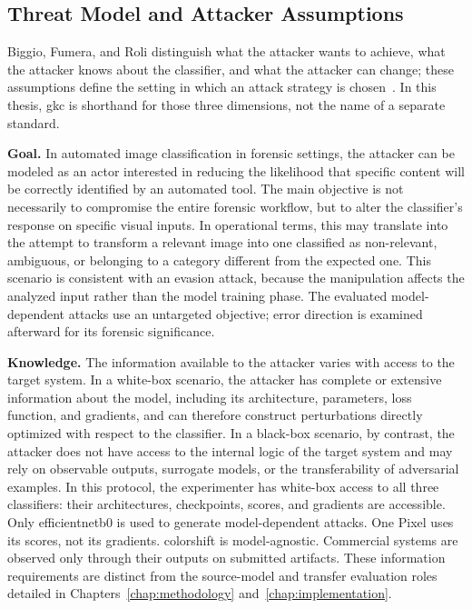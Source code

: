 \subsection{Threat Model and Attacker Assumptions}
\label{subsec:background_threat_model}
Biggio, Fumera, and Roli distinguish what the attacker wants to achieve,
what the attacker knows about the classifier, and what the attacker can
change; these assumptions define the setting in which an attack strategy is
chosen~\cite{biggio2014security,biggio2018wild}. In this thesis, \gls{gkc} is shorthand
for those three dimensions, not the name of a separate standard.

\textbf{Goal.} In automated image classification in forensic settings, the
attacker can be modeled as an actor interested in reducing the likelihood that
specific content will be correctly identified by an automated tool. The main
objective is not necessarily to compromise the entire forensic workflow, but to
alter the classifier's response on specific visual inputs. In operational
terms, this may translate into the attempt to transform a relevant image into
one classified as non-relevant, ambiguous, or belonging to a category different
from the expected one. This scenario is consistent with an evasion attack,
because the manipulation affects the analyzed input rather than the model
training phase. The evaluated model-dependent attacks use an untargeted
objective; error direction is examined afterward for its forensic significance.

\textbf{Knowledge.} The information available to the attacker varies with access
to the target system. In a white-box scenario, the attacker has complete or extensive
information about the model, including its architecture, parameters, loss
function, and gradients, and can therefore construct perturbations directly
optimized with respect to the classifier. In a black-box scenario, by contrast,
the attacker does not have access to the internal logic of the target system
and may rely on observable outputs, surrogate models, or the transferability of
adversarial examples. In this protocol, the experimenter has white-box access
to all three classifiers: their architectures, checkpoints, scores, and
gradients are accessible. Only \gls{efficientnetb0} is used to generate
model-dependent attacks. One Pixel uses its scores, not its gradients.
\gls{colorshift} is model-agnostic. Commercial systems are observed only
through their outputs on submitted artifacts. These information requirements are distinct from the
source-model and transfer evaluation roles detailed in
Chapters~\ref{chap:methodology} and~\ref{chap:implementation}.

